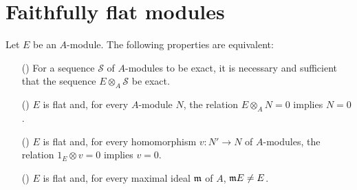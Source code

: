 \section{Faithfully flat modules}
\begin{proposition}\label{module faithfully flat iff}
Let $E$ be an $A$-module. The following properties are equivalent:
\begin{itemize}
\item[(\rmnum{1})] For a sequence $\mathscr{S}$ of $A$-modules to be exact, it is necessary and sufficient that the sequence $E\otimes_A\mathscr{S}$ be exact.
\item[(\rmnum{2})] $E$ is flat and, for every $A$-module $N$, the relation $E\otimes_AN=0$ implies $N=0$.
\item[(\rmnum{3})] $E$ is flat and, for every homomorphism $v:N'\to N$ of $A$-modules, the relation $1_E\otimes v=0$ implies $v=0$.
\item[(\rmnum{4})] $E$ is flat and, for every maximal ideal $\mathfrak{m}$ of $A$, $\mathfrak{m} E\neq E$.
\end{itemize}
\end{proposition}

